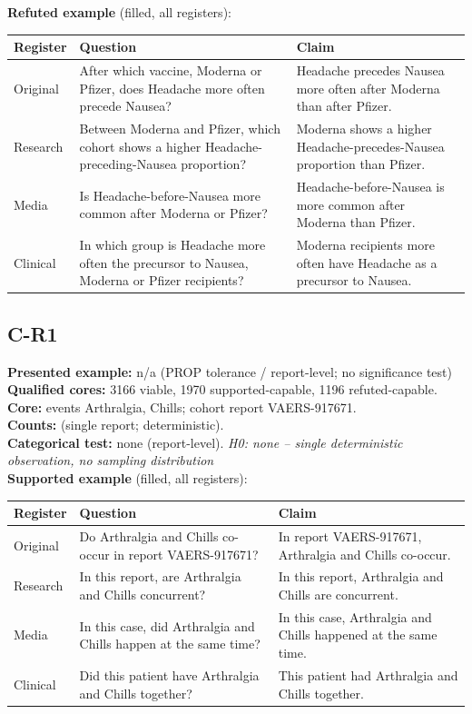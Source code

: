 \documentclass[11pt]{article}
\begin{document}
\vspace{3pt}
\textbf{Refuted example} (filled, all registers): \\
\begin{tabularx}{\linewidth}{@{}l L L@{}}
\toprule
\textbf{Register} & \textbf{Question} & \textbf{Claim} \\
\midrule
Original & After which vaccine, Moderna or Pfizer, does Headache more often precede Nausea? & Headache precedes Nausea more often after Moderna than after Pfizer. \\
Research & Between Moderna and Pfizer, which cohort shows a higher Headache-preceding-Nausea proportion? & Moderna shows a higher Headache-precedes-Nausea proportion than Pfizer. \\
Media & Is Headache-before-Nausea more common after Moderna or Pfizer? & Headache-before-Nausea is more common after Moderna than Pfizer. \\
Clinical & In which group is Headache more often the precursor to Nausea, Moderna or Pfizer recipients? & Moderna recipients more often have Headache as a precursor to Nausea. \\
\bottomrule
\end{tabularx}
\vspace{3pt}

\subsection*{C-R1}
\textbf{Presented example:} n/a (PROP tolerance / report-level; no significance test) \\
\textbf{Qualified cores:} 3166 viable, 1970 supported-capable, 1196 refuted-capable. \\
\textbf{Core:} events Arthralgia, Chills; cohort report VAERS-917671. \\
\textbf{Counts:} (single report; deterministic). \\
\textbf{Categorical test:} none (report-level). \emph{H0: none -- single deterministic observation, no sampling distribution} \\
\textbf{Supported example} (filled, all registers): \\
\begin{tabularx}{\linewidth}{@{}l L L@{}}
\toprule
\textbf{Register} & \textbf{Question} & \textbf{Claim} \\
\midrule
Original & Do Arthralgia and Chills co-occur in report VAERS-917671? & In report VAERS-917671, Arthralgia and Chills co-occur. \\
Research & In this report, are Arthralgia and Chills concurrent? & In this report, Arthralgia and Chills are concurrent. \\
Media & In this case, did Arthralgia and Chills happen at the same time? & In this case, Arthralgia and Chills happened at the same time. \\
Clinical & Did this patient have Arthralgia and Chills together? & This patient had Arthralgia and Chills together. \\
\bottomrule
\end{tabularx}
\vspace{3pt}
\end{document}
